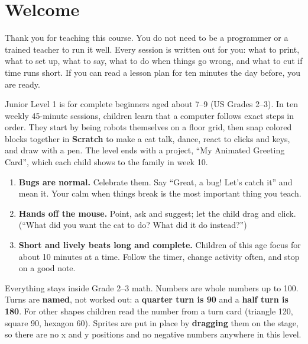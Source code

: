 \documentclass[track=junior,level=1,teacher]{kidscode}
\begin{document}
\tableofcontents

\section{Welcome}
Thank you for teaching this course. You do not need to be a programmer or a trained teacher to run
it well. Every session is written out for you: what to print, what to set up, what to say, what to do
when things go wrong, and what to cut if time runs short. If you can read a lesson plan for ten
minutes the day before, you are ready.

Junior Level 1 is for complete beginners aged about 7--9 (US Grades 2--3). In ten weekly
45-minute sessions, children learn that a computer follows exact steps in order. They start by
being robots themselves on a floor grid, then snap colored blocks together in \textbf{Scratch} to
make a cat talk, dance, react to clicks and keys, and draw with a pen. The level ends with a project,
\enquote{My Animated Greeting Card}, which each child shows to the family in week 10.

\begin{teachernote}
\begin{enumerate}[itemsep=2pt]
  \item \textbf{Bugs are normal.} Celebrate them. Say \enquote{Great, a bug! Let's catch it} and mean it.
        Your calm when things break is the most important thing you teach.
  \item \textbf{Hands off the mouse.} Point, ask and suggest; let the child drag and click.
        (\enquote{What did you want the cat to do? What did it do instead?})
  \item \textbf{Short and lively beats long and complete.} Children of this age focus for about
        10 minutes at a time. Follow the timer, change activity often, and stop on a good note.
\end{enumerate}
\end{teachernote}

\begin{teachernote}
Everything stays inside Grade 2--3 math. Numbers are whole numbers up to 100. Turns are
\textbf{named}, not worked out: a \textbf{quarter turn is 90} and a \textbf{half turn is 180}. For other shapes
children read the number from a turn card (triangle 120, square 90, hexagon 60). Sprites are put
in place by \textbf{dragging} them on the stage, so there are no x and y positions and no negative
numbers anywhere in this level.
\end{teachernote}
\end{document}

